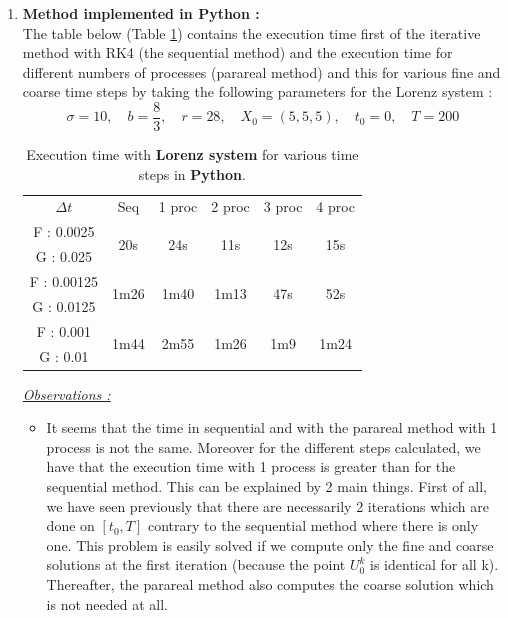 \begin{enumerate}[label=\textbullet]
	\item \textbf{Method implemented in Python :} \\
	The table below (Table \ref{time}) contains the execution time first of the iterative method with RK4 (the sequential method) and the execution time for different numbers of processes (parareal method) and this for various fine and coarse time steps by taking the following parameters for the Lorenz system :
	$$\sigma=10, \quad b=\frac{8}{3}, \quad r=28, \quad X_0=(5,5,5), \quad t_0=0, \quad T=200$$
	\renewcommand{\arraystretch}{1.2}
	\begin{table}[H]
		\centering
		\begin{tabular}{| c || c | c | c | c | c |}
			\hline
			\multirow{2}{1.5 cm}{$\Delta t$} & \multirow{2}{1.5 cm}{Seq} & \multirow{2}{1.5 cm}{1 proc} & \multirow{2}{1.5 cm}{2 proc} & \multirow{2}{1.5 cm}{3 proc} &\multirow{2}{1.5 cm}{4 proc} \\
			& & & & & \\
			\hline 
			F : 0.0025 & \multirow{2}{1.5 cm}{20s} & \multirow{2}{1.5 cm}{24s} & \multirow{2}{1.5 cm}{11s} & \multirow{2}{1.5 cm}{12s} & \multirow{2}{1.5 cm}{15s} \\
			G : 0.025 & & & & & \\
			\hline 
			F : 0.00125 & \multirow{2}{1.5 cm}{1m26} & \multirow{2}{1.5 cm}{1m40} & \multirow{2}{1.5 cm}{1m13} & \multirow{2}{1.5 cm}{47s} & \multirow{2}{1.5 cm}{52s} \\
			G : 0.0125 & & & & & \\
			\hline 
			F : 0.001 & \multirow{2}{1.5 cm}{1m44} & \multirow{2}{1.5 cm}{2m55} & \multirow{2}{1.5 cm}{1m26} & \multirow{2}{1.5 cm}{1m9} & \multirow{2}{1.5 cm}{1m24} \\
			G : 0.01 & & & & & \\	 
			\hline
		\end{tabular}
		\caption{Execution time with \textbf{Lorenz system} for various time steps in \textbf{Python}.}
		\label{time}
	\end{table}
	\newpage
	\noindent \underline{\textit{Observations :}} 
	\begin{itemize}[label=-]
		\item It seems that the time in sequential and with the parareal method with 1 process is not the same. Moreover for the different steps calculated, we have that the execution time with 1 process is greater than for the sequential method. This can be explained by 2 main things. First of all, we have seen previously that there are necessarily 2 iterations which are done on $[t_0,T]$ contrary to the sequential method where there is only one. This problem is easily solved if we compute only the fine and coarse solutions at the first iteration (because the point $U_0^k$ is identical for all k). Thereafter, the parareal method also computes the coarse solution which is not needed at all.

\end{itemize}
\end{enumerate}
